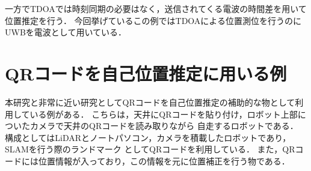 一方でTDOAでは時刻同期の必要はなく，送信されてくる電波の時間差を用いて位置推定を行う．
今回挙げているこの例ではTDOAによる位置測位を行うのにUWBを電波として用いている．

\section{QRコードを自己位置推定に用いる例}
本研究と非常に近い研究としてQRコードを自己位置推定の補助的な物として利用している例がある\cite{qrrobot}．
こちらは，天井にQRコードを貼り付け，ロボット上部についたカメラで天井のQRコードを読み取りながら
自走するロボットである．
構成としてはLiDARとノートパソコン，カメラを積載したロボットであり，SLAMを行う際のランドマーク
としてQRコードを利用している．
また，QRコードには位置情報が入っており，この情報を元に位置補正を行う物である．

